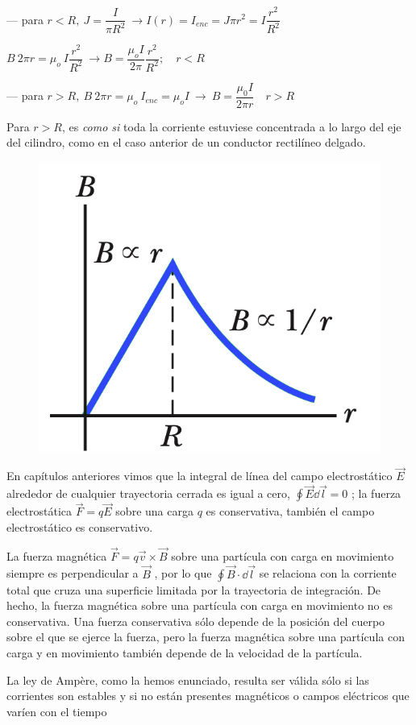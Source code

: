 \vspace{5mm} %
--- para $r<R,\ J=\dfrac I {\pi R^2 } \ \to I(r)=I_{enc}=J \pi r^2=I\dfrac{r^2}{R^2}$

$B\ 2\pi r=\mu_o \ I\dfrac{r^2}{R^2} \ \to B=\dfrac {\mu_o I}{2\pi} \dfrac{r^2}{R^2};\quad r<R$

\vspace{10mm} %

\begin{multicols}{2}
--- para $r>R, \ B\ 2\pi r=\mu_o \ I_{enc}=\mu_o I \ \to \ B=\dfrac{\mu_0I}{2\pi r}\quad r>R$


Para $r>R$, es \emph{como si} toda la corriente estuviese concentrada a lo largo del eje del cilindro, como en el caso anterior de un conductor rectilíneo delgado. 
\begin{figure}[H]
	\centering
	\includegraphics[width=.3\textwidth]{imagenes/imagenes27/T27IM07.png}
\end{figure}	
\end{multicols}

En capítulos anteriores vimos que la integral de línea del campo electrostático $\vec E$ alrededor de cualquier trayectoria cerrada es igual a cero, $\oint \vec E \dd \vec l =0$ ;  la fuerza electrostática  $\vec F = q \vec E$ sobre una carga $q$ es conservativa, también el campo electrostático es conservativo.

La fuerza magnética  $\vec F = q \vec v \times \vec  B$  sobre una partícula con carga en movimiento siempre es perpendicular a $\vec B$ , por lo que $\oint \vec B \cdot \dd \vec l$  se relaciona con la corriente total que cruza una superficie limitada por la trayectoria de integración. De hecho, la fuerza magnética sobre una partícula con carga en movimiento no es conservativa.  Una fuerza conservativa sólo depende de la posición del cuerpo sobre el que se ejerce la fuerza, pero la fuerza magnética sobre una partícula con carga y en movimiento también depende de la velocidad de la partícula. 

La ley de Ampère, como la hemos enunciado, resulta ser válida sólo si las corrientes son estables y si no están presentes magnéticos o campos eléctricos que varíen con el tiempo 

